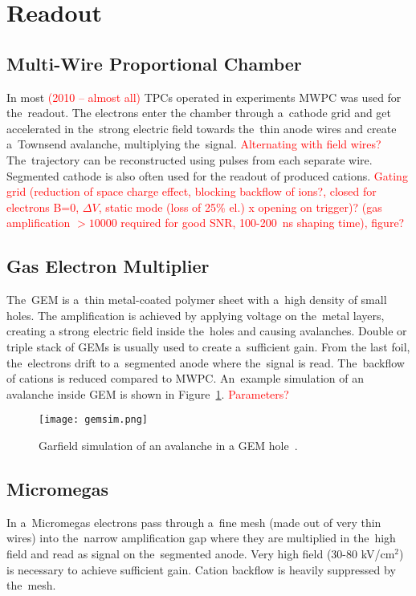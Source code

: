 	\section{Readout}
		\subsection{Multi-Wire Proportional Chamber}
			In most \textcolor{red}{(2010 -- almost all)} \ac{TPC}s operated in experiments \acf{MWPC} was used for the~readout. The electrons enter the chamber through a~cathode grid and get accelerated in the~strong electric field towards the~thin anode wires and create a~Townsend avalanche, multiplying the~signal. \textcolor{red}{Alternating with field wires?} The~trajectory can be reconstructed using pulses from each separate wire. Segmented cathode is also often used for the readout of produced cations. \textcolor{red}{Gating grid (reduction of space charge effect, blocking backflow of ions?, closed for electrons B=0, $\Delta V$, static mode (loss of 25\% el.) x opening on trigger)? (gas amplification $>10000$ required for good SNR, 100-200~ns shaping time), figure?}
			
		\subsection{Gas Electron Multiplier}
			The~\acf{GEM} is a~thin metal\nobreakdash-coated polymer sheet with a~high density of small holes. The amplification is achieved by applying voltage on the~metal layers, creating a strong electric field inside the~holes and causing avalanches. Double or triple stack of \ac{GEM}s is usually used to create a~sufficient gain. From the last foil, the~electrons drift to a~segmented anode where the~signal is read. The~backflow of cations is reduced compared to \ac{MWPC}. An~example simulation of an avalanche inside \ac{GEM} is shown in Figure~\ref{fig:gemsim}. \textcolor{red}{Parameters?}
			
			\begin{figure}
				\centering
				\texttt{[image: gemsim.png]}
				\caption{Garfield simulation of an avalanche in a \ac{GEM} hole~\cite{gemsim}.}
				\label{fig:gemsim}
			\end{figure}
		
		\subsection{Micromegas}
			In a~\ac{Micromegas} electrons pass through a~fine mesh (made out of very thin wires) into the~narrow amplification gap where they are multiplied in the~high field and read as signal on the~segmented anode. Very high field (30-80 kV/cm$^2$) is necessary to achieve sufficient gain. Cation backflow is heavily suppressed by the~mesh.
			
